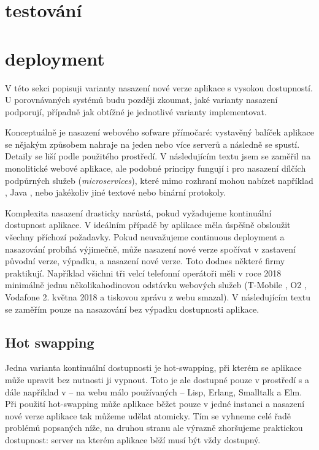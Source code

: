 
    \section{testování}
        \blind[4]

    \section{deployment}
        \blind[1]

        V této sekci popisuji varianty nasazení nové verze aplikace s vysokou dostupností. U porovnávaných \CICD systémů budu později zkoumat, jaké varianty nasazení podporují, případně jak obtížné je jednotlivé varianty implementovat.

        Konceptuálně je nasazení webového sofware přímočaré: vystavěný balíček aplikace se nějakým způsobem nahraje na jeden nebo více serverů a následně se spustí. Detaily se liší podle použitého prostředí. V následujícím textu jsem se zaměřil na monolitické webové aplikace, ale podobné principy fungují i pro nasazení dílčích podpůrných služeb (\textit{microservices}), které mimo \HTTP rozhraní mohou nabízet například , Java , nebo jakékoliv jiné textové nebo binární protokoly.

        Komplexita nasazení drasticky narůstá, pokud vyžadujeme kontinuální dostupnost aplikace. V ideálním případě by aplikace měla úspěšně obsloužit všechny příchozí požadavky. Pokud neuvažujeme continuous deployment a nasazování probíhá výjimečně, může nasazení nové verze spočívat v zastavení původní verze, výpadku, a nasazení nové verze. Toto dodnes některé firmy praktikují. Například všichni tři velcí telefonní operátoři měli v roce 2018 minimálně jednu několikahodinovou odstávku webových služeb (T-Mobile \cite{tmobile-odstavka}, O2 \cite{o2-odstavka}, Vodafone 2. května 2018 a tiskovou zprávu z webu smazal). V následujícím textu se zaměřím pouze na nasazování bez výpadku dostupnosti aplikace.

        \subsection{Hot swapping}
            Jedna varianta kontinuální dostupnosti je hot-swapping, při kterém se aplikace může upravit bez nutnosti ji vypnout. Toto je ale dostupné pouze v prostředí s  a dále například v -- na webu málo používaných -- Lisp, Erlang, Smalltalk a Elm. Při použití hot-swapping může aplikace běžet pouze v jedné instanci a nasazení nové verze aplikace tak můžeme udělat atomicky. Tím se vyhneme celé řadě problémů popsaných níže, na druhou stranu ale výrazně zhoršujeme praktickou dostupnost: server na kterém aplikace běží musí být vždy dostupný.

